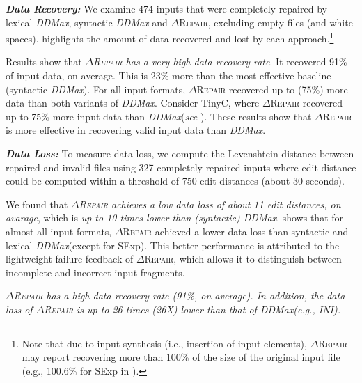 \documentclass[acmsmall,screen,review,anonymous]{acmart}
\newenvironment{result}{\begin{framed}\centering\it}{\end{framed}}
\newcommand{\recheck}[1]{\textcolor{red}{#1}}
\newcommand{\approach}{\textsc{$\Delta$Repair}\xspace}
\newcommand{\ddmax}{\textit{DDMax}\xspace}
\newcommand{\drepair}{\approach}
\begin{document}
\vspace{\baselineskip}
\noindent
\textbf{\textit{Data Recovery:}} 
We examine 474 inputs that were completely repaired by %
lexical \ddmax, syntactic \ddmax and \approach, excluding empty files (and white spaces).  %
highlights the amount of data %
recovered and lost %
by each approach.\footnote{Note that due to input synthesis (i.e., insertion of input elements), \drepair may report recovering more than 100\% of the size of the original input file (e.g., 100.6\% for SExp in ).} %

Results show that \textit{\approach has a very high data recovery rate}. 
It recovered 91\% of input data, on average. 
This is 23\% more than the most effective baseline (syntactic \ddmax). For all input formats, \approach recovered up to (75\%) more data than both variants of \ddmax. Consider TinyC, where \approach recovered up to 75\% more input data than \ddmax (\textit{see} ). These results show that \approach is more effective in recovering valid input data 
than \ddmax.

\vspace{\baselineskip}
\noindent
\textbf{\textit{Data Loss:}} To measure data loss, we compute the Levenshtein distance between repaired and invalid files using %
327 completely repaired inputs %
where edit distance could be computed within a threshold of 750 edit distances (about 30 seconds).

We found that \textit{\approach achieves a low data loss of about 11 edit distances, on avarage},  which is \textit{up to 10 times lower than (syntactic) \ddmax}.  shows that 
for almost all input formats, \approach achieved a lower data loss than syntactic and lexical \ddmax (except for SExp). This better  performance is attributed to the lightweight failure feedback of \approach, which allows it to distinguish between incomplete and incorrect input fragments.

\begin{result}
\approach has a high data recovery rate (91\%, on average).  
In addition, the data 
loss of \approach is up to 26 times (26X) lower than that of \ddmax (e.g., INI).
\end{result}
\end{document}
